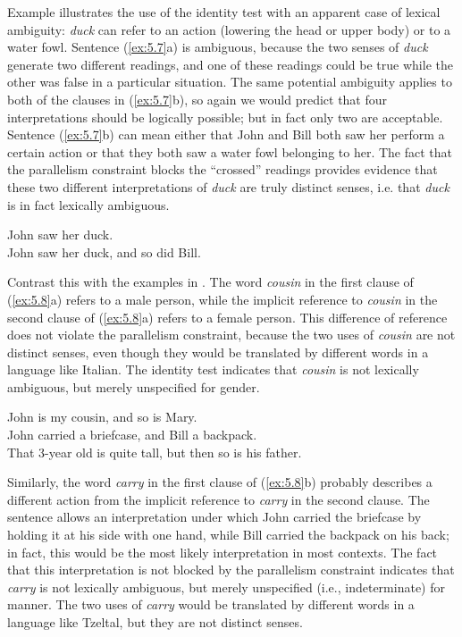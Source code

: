 Example  illustrates the use of the identity test with an apparent case of lexical ambiguity: \textit{duck} can refer to an action (lowering the head or upper body) or to a water fowl. Sentence (\ref{ex:5.7}a) is ambiguous, because the two senses of \textit{duck} generate two different readings, and one of these readings could be true while the other was false in a particular situation. The same potential ambiguity applies to both of the clauses in (\ref{ex:5.7}b), so again we would predict that four interpretations should be logically possible; but in fact only two are acceptable. Sentence (\ref{ex:5.7}b) can mean either that John and Bill both saw her perform a certain action or that they both saw a water fowl belonging to her. The fact that the parallelism constraint blocks the “crossed” readings provides evidence that these two different interpretations of \textit{duck} are truly distinct senses, i.e. that \textit{duck} is in fact lexically ambiguous.


\ea \label{ex:5.7}
\ea John saw her duck.\\
\ex John saw her duck, and so did Bill.
\z
                       \z


Contrast this with the examples in . The word \textit{cousin} in the first clause of (\ref{ex:5.8}a) refers to a male person, while the implicit reference to \textit{cousin} in the second clause of (\ref{ex:5.8}a) refers to a female person. This difference of reference does not violate the parallelism constraint, because the two uses of \textit{cousin} are not distinct senses, even though they would be translated by different words in a language like Italian. The identity test indicates that \textit{cousin} is not lexically ambiguous, but merely unspecified for gender.


\ea \label{ex:5.8}
\ea John is my cousin, and so is Mary.\\
\ex John carried a briefcase, and Bill a backpack.\\
\ex That 3-year old is quite tall, but then so is his father.
                       \z
\z


Similarly, the word \textit{carry} in the first clause of (\ref{ex:5.8}b) probably describes a different action from the implicit reference to \textit{carry} in the second clause. The sentence allows an interpretation under which John carried the briefcase by holding it at his side with one hand, while Bill carried the backpack on his back; in fact, this would be the most likely interpretation in most contexts. The fact that this interpretation is not blocked by the parallelism constraint indicates that \textit{carry} is not lexically ambiguous, but merely unspecified (i.e., indeterminate) for manner. The two uses of \textit{carry} would be translated by different words in a language like Tzeltal, but they are not distinct senses.



